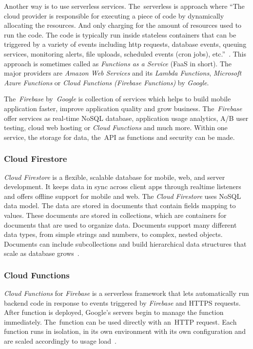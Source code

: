 Another way is to use serverless services. The~serverless is approach where ``The cloud provider is responsible for executing a piece of code by dynamically allocating the resources. And only charging for the amount of resources used to run the code. The code is typically run inside stateless containers that can be triggered by a variety of events including http requests, database events, queuing services, monitoring alerts, file uploads, scheduled events (cron jobs), etc.''~\cite{what-is-serverless}. This approach is sometimes called as \textit{Functions as a Service} (FaaS in short). The major providers are \textit{Amazon Web Services} and its \textit{Lambda Functions}, \textit{Microsoft Azure Functions} or \textit{Cloud Functions (Firebase Functions)} by \textit{Google}. 

The~\textit{Firebase} by~\textit{Google} is collection of services which helps to build mobile application faster, improve application quality and grow business. The~\textit{Firebase} offer services as real-time NoSQL database, application usage analytics, A/B user testing, cloud web hosting or \textit{Cloud Functions} and much more. Within one service, the storage for data, the~API as functions and security can be made. 
\subsubsection{Cloud Firestore}
\textit{Cloud Firestore} is a flexible, scalable database for mobile, web, and server development. It keeps data in sync across client apps through realtime listeners and offers offline support for mobile and web. The \textit{Cloud Firestore} uses NoSQL data model. The data are stored in documents that contain fields mapping to values. These documents are stored in collections, which are containers for documents that are used to organize data. Documents support many different data types, from simple strings and numbers, to complex, nested objects. Documents can include subcollections and build hierarchical data structures that scale as database grows~\cite{cloud-firestore}.
\subsubsection{Cloud Functions}
\textit{Cloud Functions} for \textit{Firebase} is a serverless framework that lets automatically run backend code in response to events triggered by \textit{Firebase} and HTTPS requests. After function is deployed, Google's servers begin to manage the function immediately. The~function can be used directly with an~HTTP request. Each function runs in isolation, in its own environment with its own configuration and are scaled accordingly to usage load~\cite{cloud-functions}. 
